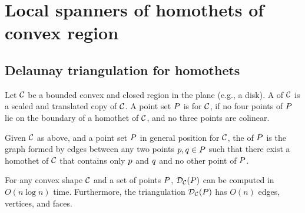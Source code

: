 \documentclass[12pt]{article}%
\begin{document}
\begin{lemma}
    \LemmaRefineDWBody{}%
\end{lemma}


\section{Local spanners of homothets of convex region}

\subsection{Delaunay triangulation for homothets}

Let $\mathcal{C}$ be a bounded convex and closed region in the plane (e.g., a
disk).  A  of $\mathcal{C}$ is a scaled and translated copy of
$\mathcal{C}$.  A point set $P$ is  for $\mathcal{C}$, if no
four points of $P$ lie on the boundary of a homothet of $\mathcal{C}$, and
no three points are colinear.


\begin{defn}
    Given $\mathcal{C}$ as above, and a point set $P$ in general position
    for $\mathcal{C}$, the  of $P$ is
    the graph formed by edges between any two points $p,q\in P$
    such that there exist a homothet of $\mathcal{C}$ that contains only $p$
    and $q$ and no other point of $P$.
\end{defn}

\begin{theorem}
    For any convex shape $\mathcal{C}$ and a set of points $P$,
    $\mathcal{D}_{\mathcal{C}}(P)$ can be computed in $O(n \log n)$ time.
    Furthermore, the triangulation $\mathcal{D}_{\mathcal{C}}(P)$ has $O(n)$ edges,
    vertices, and faces.
\end{theorem}
\end{document}
